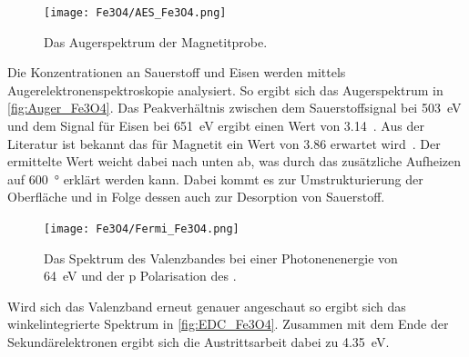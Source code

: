         \begin{figure}
            \centering
            \texttt{[image: Fe3O4/AES\_Fe3O4.png]}
            \caption{Das Augerspektrum der Magnetitprobe.}
            \label{fig:Auger_Fe3O4}
        \end{figure}
        Die Konzentrationen an Sauerstoff und Eisen werden mittels Augerelektronenspektroskopie analysiert.
        So ergibt sich das Augerspektrum in \autoref{fig:Auger_Fe3O4}.
        Das Peakverhältnis zwischen dem Sauerstoffsignal bei \SI{503}{\electronvolt} und dem Signal für Eisen bei \SI{651}{\electronvolt} ergibt einen Wert von \num{3.14}~\cite{FeO_1, Auger}.
        Aus der Literatur ist bekannt das für Magnetit ein Wert von \num{3.86} erwartet wird~\cite{FeO_1}.
        Der ermittelte Wert weicht dabei nach unten ab, was durch das zusätzliche Aufheizen auf \SI{600}{\degree} erklärt werden kann.
        Dabei kommt es zur Umstrukturierung der Oberfläche und in Folge dessen auch zur Desorption von Sauerstoff.

        \begin{figure}
            \centering
            \texttt{[image: Fe3O4/Fermi\_Fe3O4.png]}
            \caption{Das Spektrum des Valenzbandes bei einer Photonenenergie von \SI{64}{\electronvolt} und der p Polarisation des .}
            \label{fig:EDC_Fe3O4}
        \end{figure}
        Wird sich das Valenzband erneut genauer angeschaut so ergibt sich das winkelintegrierte Spektrum in \autoref{fig:EDC_Fe3O4}.
        Zusammen mit dem Ende der Sekundärelektronen ergibt sich die Austrittsarbeit dabei zu \SI{4.35}{\electronvolt}.

